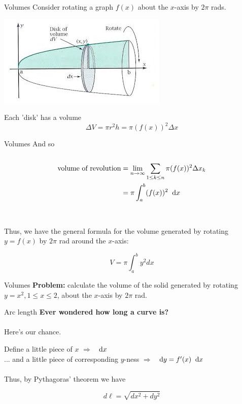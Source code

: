 \documentclass{beamer}
\renewcommand{\d}{\hspace{0.2cm}\text{d}}
\begin{document}
\begin{frame}{Volumes}
	Consider rotating a graph $f(x)$ about the $x$-axis by $2\pi$ rads.
	\begin{center}
	\includegraphics[width = 0.65\linewidth]{img/rotation.jpg}
	\end{center}
	
	Each 'disk' has a volume
	$$ \Delta V = \pi r^2 h = \pi(f(x))^2\Delta x$$
\end{frame}

\begin{frame}{Volumes}
	And so\\~\\
	\begin{align*}
		\text{volume of revolution} &= \lim_{n \to \infty} \sum_{1 \le k \le n} \pi (f(x))^2 \Delta x_k	\\
		&= \pi \int_a^b (f(x))^2 \d x
	\end{align*}
	\\~\\
	Thus, we have the general formula for the volume generated by rotating $y = f(x)$ by $2\pi$ rad around the $x$-axis:
	
	$$V = \pi \int_a^b y^2 dx$$
\end{frame}

\begin{frame}{Volumes}
	\textbf{Problem: } calculate the volume of the solid generated by rotating $y = x^2, 1\le x \le 2$, about the $x$-axis by $2\pi$ rad.
	\vspace{5cm}
\end{frame}	

\begin{frame}{Arc length}
	\textbf{Ever wondered how long a curve is?}\\~\\
	Here's our chance.
	
	Define a little piece of $x$ $\Rightarrow$ $\d x$\\
	... and a little piece of corresponding $y$-ness $\Rightarrow$ $\d y = f'(x) \d x$
	\\~\\
	Thus, by Pythagoras' theorem we have
	
	$$d\ell = \sqrt{dx^2 + dy^2}$$
\end{frame}
\end{document}
